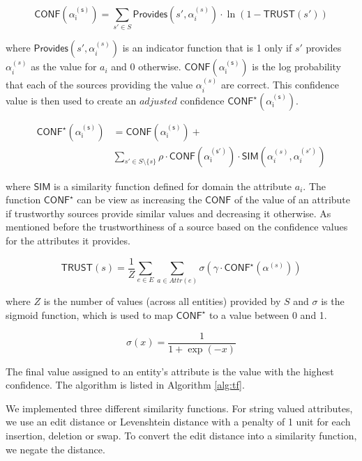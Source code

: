\documentclass{acm_proc_article-sp}
\begin{document}
\begin{equation}
\mathsf{CONF(\alpha_i^{(s)})} = \sum_{s' \in S} \mathsf{Provides}(s',\alpha_i^{(s)}) \cdot \ln(1-\mathsf{TRUST}(s'))
\end{equation}

where $\mathsf{Provides}(s',\alpha_i^{(s)})$ is an indicator function that is 1 only if $s'$ provides $\alpha_i^{(s)}$ as the value for $a_i$ and 0 otherwise. $\mathsf{CONF(\alpha_i^{(s)})}$ is the log probability that each of the sources providing the value $\alpha_i^{(s)}$ are correct. This confidence value is then used to create an $adjusted$ confidence $\mathsf{CONF^\star(\alpha_i^{(s)})}$.

\begin{align}
\mathsf{CONF^\star(\alpha_i^{(s)})} &= \mathsf{CONF(\alpha_i^{(s)})} + \\ \nonumber
&  \sum_{s' \in S \setminus \{s\}} \rho \cdot \mathsf{CONF(\alpha_i^{(s')})}  \cdot \mathsf{SIM}(\alpha_i^{(s)},\alpha_i^{(s')})
\end{align}

where $\mathsf{SIM}$ is a similarity function defined  for domain the attribute $a_i$. The function $\mathsf{CONF}^\star$ can be view as increasing  the $\mathsf{CONF}$ of the value of an attribute if trustworthy sources provide similar values and decreasing it otherwise. As mentioned before the trustworthiness of a source based on the confidence values for the attributes it provides. 

\begin{equation}
\mathsf{TRUST}(s) = \frac{1}{Z} \sum_{e \in E}\sum_{a \in Attr(e)} \sigma(\gamma \cdot \mathsf{CONF}^\star(\alpha^{(s)}))
\end{equation}

where $Z$ is the number of values (across all entities) provided by $S$ and $\sigma$ is the sigmoid function, which is used to map $\mathsf{CONF}^\star$ to a value between 0 and 1.

\begin{equation}
\sigma(x) = \frac{1}{1 + \exp{(-x)}}
\end{equation}

The final value assigned to an entity's attribute is the value with the highest confidence. The algorithm is listed in Algorithm \ref{alg:tf}.

We implemented three different similarity functions. For string valued attributes, we use an edit distance or Levenshtein distance with a penalty of 1 unit for each insertion, deletion or swap. To convert the edit distance into a similarity function, we negate the distance. 
\end{document}
